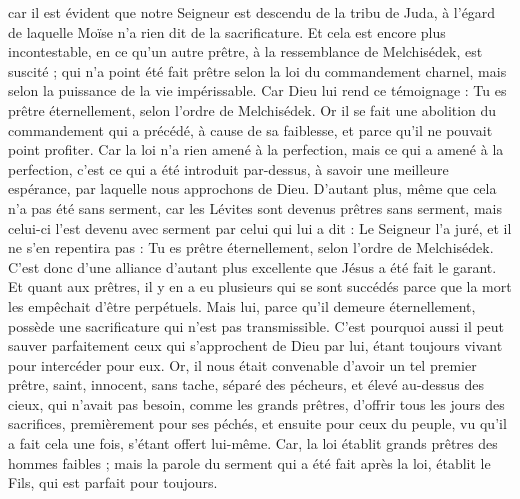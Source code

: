 \begin{multicols}{2}
car il est évident que notre Seigneur est descendu de la tribu de Juda, à l'égard de laquelle Moïse n'a rien dit de la sacrificature.
Et cela est encore plus incontestable, en ce qu'un autre prêtre, à la ressemblance de Melchisédek, est suscité ;
qui n'a point été fait prêtre selon la loi du commandement charnel, mais selon la puissance de la vie impérissable.
Car Dieu lui rend ce témoignage : Tu es prêtre éternellement, selon l'ordre de Melchisédek.
Or il se fait une abolition du commandement qui a précédé, à cause de sa faiblesse, et parce qu'il ne pouvait point profiter.
Car la loi n'a rien amené à la perfection, mais ce qui a amené à la perfection, c'est ce qui a été introduit par-dessus, à savoir une meilleure espérance, par laquelle nous approchons de Dieu.
D'autant plus, même que cela n'a pas été sans serment,
car les Lévites sont devenus prêtres sans serment, mais celui-ci l'est devenu avec serment par celui qui lui a dit : Le Seigneur l'a juré, et il ne s'en repentira pas : Tu es prêtre éternellement, selon l'ordre de Melchisédek.
C'est donc d'une alliance d'autant plus excellente que Jésus a été fait le garant.
Et quant aux prêtres, il y en a eu plusieurs qui se sont succédés parce que la mort les empêchait d'être perpétuels.
Mais lui, parce qu'il demeure éternellement, possède une sacrificature qui n'est pas transmissible.
C'est pourquoi aussi il peut sauver parfaitement ceux qui s'approchent de Dieu par lui, étant toujours vivant pour intercéder pour eux.
Or, il nous était convenable d'avoir un tel premier prêtre, saint, innocent, sans tache, séparé des pécheurs, et élevé au-dessus des cieux,
qui n'avait pas besoin, comme les grands prêtres, d'offrir tous les jours des sacrifices, premièrement pour ses péchés, et ensuite pour ceux du peuple, vu qu'il a fait cela une fois, s'étant offert lui-même.
Car, la loi établit grands prêtres des hommes faibles ; mais la parole du serment qui a été fait après la loi, établit le Fils, qui est parfait pour toujours.

\end{multicols}
